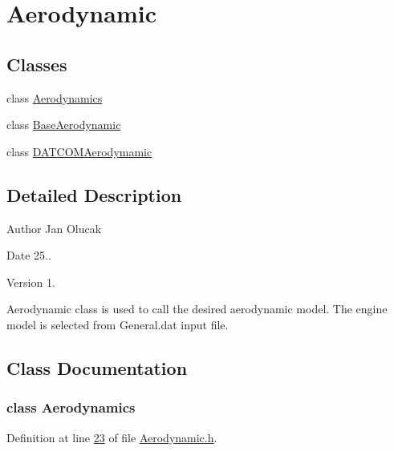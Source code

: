 \hypertarget{group___aerodynamic}{}\section{Aerodynamic}
\label{group___aerodynamic}
\subsection*{Classes}
\begin{DoxyCompactItemize}
\item 
class \hyperlink{group___aerodynamic_class_aerodynamics}{Aerodynamics}
\item 
class \hyperlink{group___aerodynamic_class_base_aerodynamic}{Base\+Aerodynamic}
\item 
class \hyperlink{group___aerodynamic_class_d_a_t_c_o_m_aerodymamic}{D\+A\+T\+C\+O\+M\+Aerodymamic}
\end{DoxyCompactItemize}


\subsection{Detailed Description}
\begin{DoxyAuthor}{Author}
Jan Olucak 
\end{DoxyAuthor}
\begin{DoxyDate}{Date}
25.. 
\end{DoxyDate}
\begin{DoxyVersion}{Version}
1.
\end{DoxyVersion}
Aerodynamic class is used to call the desired aerodynamic model. The engine model is selected from General.\+dat input file. 

\subsection{Class Documentation}
\label{class_aerodynamics}
\subsubsection{class Aerodynamics}


Definition at line \hyperlink{_aerodynamic_8h_source_l00023}{23} of file \hyperlink{_aerodynamic_8h_source}{Aerodynamic.\+h}.


